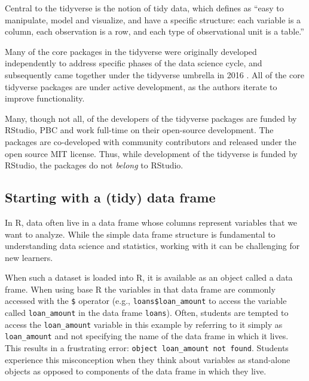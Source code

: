 \documentclass[12pt]{article}
\begin{document}
Central to the tidyverse is the notion of tidy data, which
\citet{wickham2014tidy} defines as ``easy to manipulate, model and
visualize, and have a specific structure: each variable is a column,
each observation is a row, and each type of observational unit is a
table.''

Many of the core packages in the tidyverse were originally developed
independently to address specific phases of the data science cycle, and
subsequently came together under the tidyverse umbrella in 2016
\citep{smithdavid2016}. All of the core tidyverse packages are under
active development, as the authors iterate to improve functionality.

Many, though not all, of the developers of the tidyverse packages are
funded by RStudio, PBC and work full-time on their open-source
development. The packages are co-developed with community contributors
and released under the open source MIT license. Thus, while development
of the tidyverse is funded by RStudio, the packages do not \emph{belong}
to RStudio.

\hypertarget{starting-with-a-tidy-data-frame}{%
\subsection{Starting with a (tidy) data
frame}\label{starting-with-a-tidy-data-frame}}

In R, data often live in a data frame whose columns represent variables
that we want to analyze. While the simple data frame structure is
fundamental to understanding data science and statistics, working with
it can be challenging for new learners.

When such a dataset is loaded into R, it is available as an object
called a data frame. When using base R the variables in that data frame
are commonly accessed with the \texttt{\$} operator (e.g.,
\texttt{loans\$loan\_amount} to access the variable called
\texttt{loan\_amount} in the data frame \texttt{loans}). Often, students
are tempted to access the \texttt{loan\_amount} variable in this example
by referring to it simply as \texttt{loan\_amount} and not specifying
the name of the data frame in which it lives. This results in a
frustrating error:
\texttt{object\ \textquotesingle{}loan\_amount\textquotesingle{}\ not\ found}.
Students experience this misconception when they think about variables
as stand-alone objects as opposed to components of the data frame in
which they live.
\end{document}
